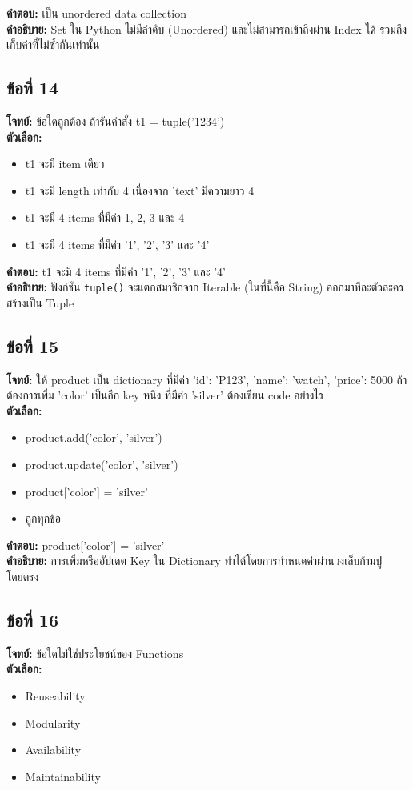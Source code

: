 \documentclass[12pt]{article}
\begin{document}
\textbf{คำตอบ:} เป็น unordered data collection\\
\textbf{คำอธิบาย:} Set ใน Python ไม่มีลำดับ (Unordered) และไม่สามารถเข้าถึงผ่าน Index ได้ รวมถึงเก็บค่าที่ไม่ซ้ำกันเท่านั้น

\subsection*{ข้อที่ 14}
\textbf{โจทย์:} ข้อใดถูกต้อง ถ้ารันคำสั่ง t1 = tuple('1234')\\
\textbf{ตัวเลือก:}
\begin{itemize}
    \item t1 จะมี item เดียว
    \item t1 จะมี length เท่ากับ 4 เนื่องจาก 'text' มีความยาว 4
    \item t1 จะมี 4 items ที่มีค่า 1, 2, 3 และ 4
    \item t1 จะมี 4 items ที่มีค่า '1', '2', '3' และ '4'
\end{itemize}

\textbf{คำตอบ:} t1 จะมี 4 items ที่มีค่า '1', '2', '3' และ '4'\\
\textbf{คำอธิบาย:} ฟังก์ชัน \texttt{tuple()} จะแตกสมาชิกจาก Iterable (ในที่นี้คือ String) ออกมาทีละตัวละครสร้างเป็น Tuple

\subsection*{ข้อที่ 15}
\textbf{โจทย์:} ให้ product เป็น dictionary ที่มีค่า {'id': 'P123', 'name': 'watch', 'price': 5000} ถ้าต้องการเพิ่ม 'color' เป็นอีก key หนึ่ง ที่มีค่า 'silver' ต้องเขียน code อย่างไร\\
\textbf{ตัวเลือก:}
\begin{itemize}
    \item product.add('color', 'silver')
    \item product.update('color', 'silver')
    \item product['color'] = 'silver'
    \item ถูกทุกข้อ
\end{itemize}

\textbf{คำตอบ:} product['color'] = 'silver'\\
\textbf{คำอธิบาย:} การเพิ่มหรืออัปเดต Key ใน Dictionary ทำได้โดยการกำหนดค่าผ่านวงเล็บก้ามปูโดยตรง

\subsection*{ข้อที่ 16}
\textbf{โจทย์:} ข้อใดไม่ใช่ประโยชน์ของ Functions\\
\textbf{ตัวเลือก:}
\begin{itemize}
    \item Reuseability
    \item Modularity
    \item Availability
    \item Maintainability
\end{itemize}
\end{document}
